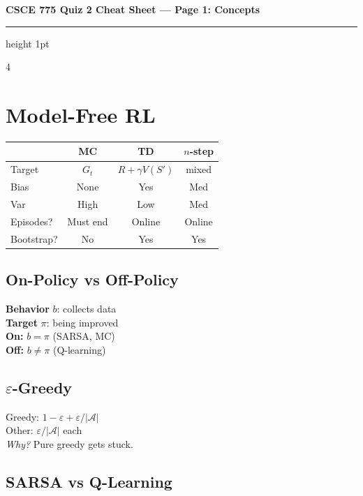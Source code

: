 \documentclass[6pt]{article}
\newcommand{\conceptbox}[2]{%
\begin{tcolorbox}[colback=atlantic!5, colframe=atlantic, title={\scriptsize\bfseries\color{white}#1}, coltitle=white, colbacktitle=atlantic, toptitle=1pt, bottomtitle=1pt]
#2
\end{tcolorbox}
}
\begin{document}
\begin{center}
{\large\bfseries\color{garnet} CSCE 775 Quiz 2 Cheat Sheet --- Page 1: Concepts}
\end{center}
\vspace{-4pt}
\hrule height 1pt
\vspace{2pt}

\begin{multicols}{4}

\section{Model-Free RL}

\conceptbox{MC vs TD vs $n$-step}{
\begin{tabular}{@{}lccc@{}}
& \textbf{MC} & \textbf{TD} & $n$\textbf{-step} \\
\midrule
Target & $G_t$ & $R\!+\!\gamma V(S')$ & mixed \\
Bias & None & Yes & Med \\
Var & High & Low & Med \\
Episodes? & Must end & Online & Online \\
Bootstrap? & No & Yes & Yes \\
\end{tabular}
}

\subsection{On-Policy vs Off-Policy}
\textbf{Behavior} $b$: collects data\\
\textbf{Target} $\pi$: being improved\\
\textbf{On:} $b = \pi$ (SARSA, MC)\\
\textbf{Off:} $b \neq \pi$ (Q-learning)

\subsection{$\varepsilon$-Greedy}
Greedy: $1 - \varepsilon + \varepsilon/|\mathcal{A}|$\\
Other: $\varepsilon/|\mathcal{A}|$ each\\
\textit{Why?} Pure greedy gets stuck.

\subsection{SARSA vs Q-Learning}


\end{multicols}
\end{document}
